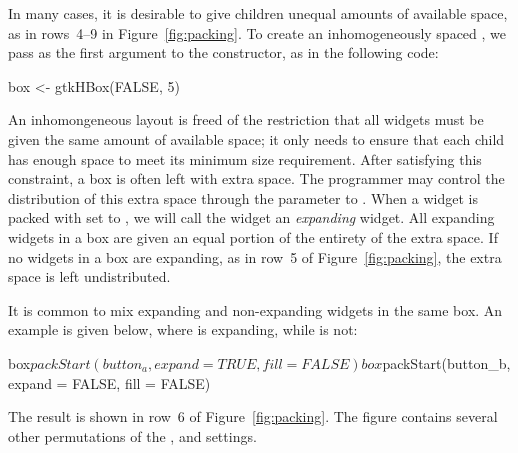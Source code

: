 In many cases, it is desirable to give children unequal amounts of
available space, as in rows~4--9 in Figure~\ref{fig:packing}. 
To create an inhomogeneously spaced , we pass
 as the first argument to the constructor, as in the
following code:
\begin{Schunk}
\begin{Sinput}
 box <- gtkHBox(FALSE, 5)
\end{Sinput}
\end{Schunk}

An inhomongeneous layout is freed of the restriction that all widgets
must be given the same amount of available space; it only needs to
ensure that each child has enough space to meet its minimum size
requirement. After satisfying this constraint, a box is often left
with extra space. The programmer may control the distribution of this
extra space through the  parameter
to .  When a widget is packed with
 set to , we will call
the widget an \emph{expanding} widget. All expanding widgets in a box
are given an equal portion of the entirety of the extra space. If no
widgets in a box are expanding, as in row~5 of
Figure~\ref{fig:packing}, the extra space is left undistributed. 

It is common to mix expanding and non-expanding widgets in the same
box.
An example is given below, where  is expanding,
while  is not:
\begin{Schunk}
\begin{Sinput}
 box$packStart(button_a, expand = TRUE, fill = FALSE)
 box$packStart(button_b, expand = FALSE, fill = FALSE)
\end{Sinput}
\end{Schunk}
%
The result is shown in row~6 of Figure~\ref{fig:packing}.  The figure
contains several other permutations of the
,
 and
 settings.

